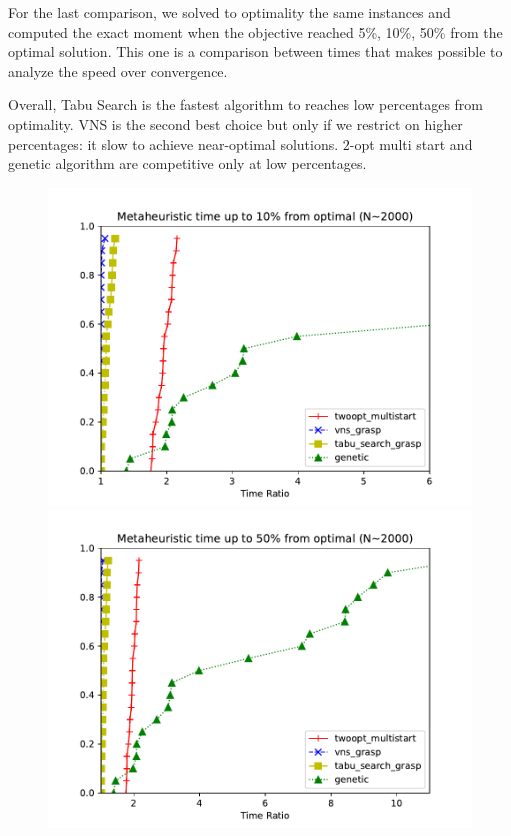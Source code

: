 For the last comparison, we solved to optimality the same instances and computed
the exact moment when the objective reached 5\%, 10\%, 50\% from the optimal
solution. This one is a comparison between times that makes possible to analyze
the speed over convergence.\\

\begin{claim}
    Overall, Tabu Search is the fastest algorithm to reaches low
    percentages from optimality. VNS is the second best choice but only if we
    restrict on higher percentages: it slow to achieve near-optimal
    solutions. $2$-opt multi start and genetic algorithm are competitive only at
    low percentages.
\end{claim}

\begin{figure}[h]
    \centering
    \begin{minipage}{.50\textwidth}
        \centering
        \includegraphics[width=\linewidth]{figures/meta_10.pdf}
    \end{minipage}%
    \begin{minipage}{.50\textwidth}
        \centering
        \includegraphics[width=\linewidth]{figures/meta_50.pdf}

\end{minipage}
\end{figure}
